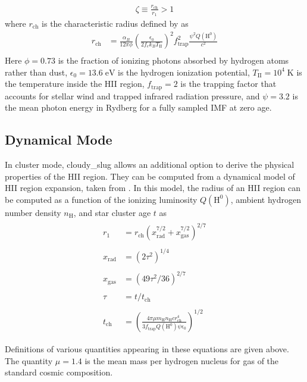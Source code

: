 \documentclass[letterpaper,10pt,english]{sphinxmanual}
\begin{document}
\begin{equation*}
\begin{split}\zeta \equiv \frac{r_{\mathrm{ch}}}{r_1} > 1\end{split}
\end{equation*}
where \(r_{\mathrm{ch}}\) is the
characteristic radius defined by  as
\begin{equation*}
\begin{split}r_{\mathrm{ch}} & =
\frac{\alpha_B}{12 \pi \phi}
\left(\frac{\epsilon_0}{2 f_e k_B T_{\mathrm{II}}}\right)^2
f_{\mathrm{trap}}^2 \frac{\psi^2 Q(\mathrm{H}^0)}{c^2}
\\\end{split}
\end{equation*}
Here  \(\phi = 0.73\) is the fraction of ionizing photons absorbed
by hydrogen atoms rather than dust, \(\epsilon_0 =
13.6\;\mathrm{eV}\) is the hydrogen ionization potential,
\(T_{\mathrm{II}} = 10^4\;\mathrm{K}\) is the temperature inside
the HII region, \(f_{\mathrm{trap}} = 2\) is the trapping factor
that accounts for stellar wind and trapped infrared radiation
pressure, and \(\psi = 3.2\) is the mean photon energy in Rydberg for
a fully sampled IMF at zero age.


\subsection{Dynamical Mode}
\label{\detokenize{cloudy:dynamical-mode}}\label{\detokenize{cloudy:sssec-cloudy-dynamical-cluster-mode}}
In cluster mode, cloudy\_slug allows an additional option to derive the
physical properties of the HII region. They can be computed from a
dynamical model of HII region expansion, taken from .  In this model,
the radius of an HII region can be computed as a function of the
ionizing luminosity \(Q(\mathrm{H}^0)\), ambient hydrogen number
density \(n_{\mathrm{H}}\), and star cluster age \(t\) as
\begin{align*}\!\begin{aligned}
r_1 & = r_{\mathrm{ch}}
\left(x_{\mathrm{rad}}^{7/2} +
x_{\mathrm{gas}}^{7/2}\right)^{2/7} \\\\
x_{\mathrm{rad}} &= (2\tau^2)^{1/4} \\\\
x_{\mathrm{gas}} &= (49\tau^2/36)^{2/7} \\\\
\tau &= t/t_{\mathrm{ch}} \\\\
t_{\mathrm{ch}} & = \left(\frac{4\pi \mu m_{\mathrm{H}}
n_{\mathrm{H}} c r_{\mathrm{ch}}^4}{3 f_{\mathrm{trap}}
Q(\mathrm{H}^0) \psi \epsilon_0}\right)^{1/2} \\\\
\end{aligned}\end{align*}
Definitions of various quantities appearing in these equations are
given above. The quantity \(\mu = 1.4\) is the mean
mass per hydrogen nucleus for gas of the standard cosmic
composition.
\end{document}
